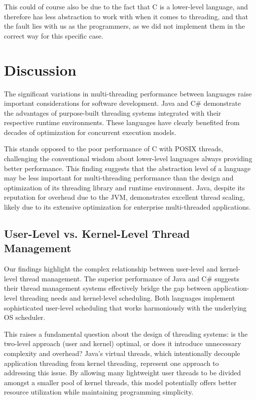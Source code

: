 \documentclass[12pt,a4paper]{article}
\begin{document}
This could of course also be due to the fact that C is a lower-level language, and therefore has less abstraction to work with when it comes to threading, and that the fault lies with us as the programmers, as we did not implement them in the correct way for this specific case. 

\section{Discussion}

The significant variations in multi-threading performance between languages raise important considerations for software development. Java and C\# demonstrate the advantages of purpose-built threading systems integrated with their respective runtime environments. These languages have clearly benefited from decades of optimization for concurrent execution models.

This stands opposed to the poor performance of C with POSIX threads, challenging the conventional wisdom about lower-level languages always providing better performance. This finding suggests that the abstraction level of a language may be less important for multi-threading performance than the design and optimization of its threading library and runtime environment. Java, despite its reputation for overhead due to the JVM, demonstrates excellent thread scaling, likely due to its extensive optimization for enterprise multi-threaded applications.

\subsection{User-Level vs. Kernel-Level Thread Management}

Our findings highlight the complex relationship between user-level and kernel-level thread management. The superior performance of Java and C\# suggests their thread management systems effectively bridge the gap between application-level threading needs and kernel-level scheduling. Both languages implement sophisticated user-level scheduling that works harmoniously with the underlying OS scheduler.

This raises a fundamental question about the design of threading systems: is the two-level approach (user and kernel) optimal, or does it introduce unnecessary complexity and overhead? Java's virtual threads, which intentionally decouple application threading from kernel threading, represent one approach to addressing this issue. By allowing many lightweight user threads to be divided amongst a smaller pool of kernel threads, this model potentially offers better resource utilization while maintaining programming simplicity.
\end{document}
